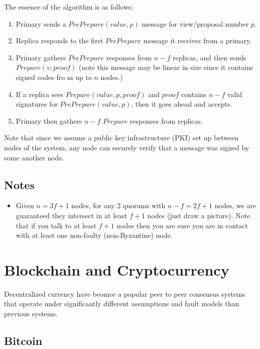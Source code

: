 \documentclass[10pt,a4paper]{article}
\begin{document}

The essence of the algorithm is as follows:
\begin{enumerate}
    \item Primary sends a $PrePrepare(value, p)$ message for view/proposal number $p$.
    \item Replica responds to the first $PrePrepare$ message it receives from a primary.
    \item Primary gathers $PrePrepare$ responses from $n-f$ replicas, and then sends $Prepare(v, proof)$ (note this message may be linear in size since it contains signed codes fro   m up to $n$ nodes.)
    \item If a replica sees $Prepare(value, p, proof)$ and $proof$ contains $n-f$ valid signatures for $PrePrepare(value, p)$, then it goes ahead and accepts.
    \item Primary then gathers $n-f$ $Prepare$ responses from replicas.
\end{enumerate}
Note that since we assume a public key infrastructure (PKI) set up between nodes of the system, any node can securely verify that a message was signed by some another node.

\subsection{Notes}
\begin{itemize}
    \item Given $n=3f+1$ nodes, for any 2 quorums with $n-f = 2f+1$ nodes, we are guaranteed they intersect in at least $f+1$ nodes (just draw a picture). Note that if you talk to at least $f+1$ nodes then you are sure you are in contact with at least one non-faulty (non-Byzantine) node.
\end{itemize}

\section{Blockchain and Cryptocurrency}

Decentralized currency have beomce a popular peer to peer consensus systems that operate under significantly different assumptions and fault models than previous systems.

\subsection*{Bitcoin}
\end{document}
